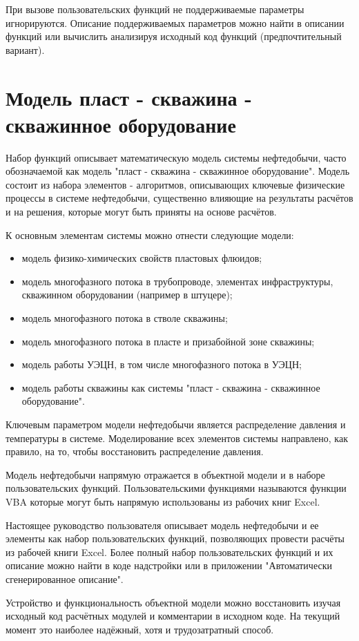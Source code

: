 При вызове пользовательских функций не поддерживаемые параметры игнорируются. Описание поддерживаемых параметров можно найти в описании функций или вычислить анализируя исходный код функций (предпочтительный вариант).

\section{Модель пласт - скважина - скважинное оборудование}

Набор функций \unf{} описывает математическую модель системы нефтедобычи, часто обозначаемой как модель "пласт - скважина - скважинное оборудование". Модель состоит из набора элементов - алгоритмов, описывающих ключевые физические процессы в системе нефтедобычи, существенно влияющие на результаты расчётов и на решения, которые могут быть приняты на основе расчётов.

К основным элементам системы можно отнести следующие модели:
\begin{itemize}
	\item модель физико-химических свойств пластовых флюидов;
	\item модель многофазного потока в трубопроводе, элементах инфраструктуры, скважинном оборудовании (например в штуцере);
	\item модель многофазного потока в стволе скважины;
	\item модель многофазного потока в пласте и призабойной зоне скважины;
	\item модель работы УЭЦН, в том числе многофазного потока в УЭЦН;
	\item модель работы скважины как системы "пласт - скважина - скважинное оборудование".
\end{itemize}

Ключевым параметром модели нефтедобычи является распределение давления и температуры в системе. Моделирование всех элементов системы направлено, как правило, на то, чтобы восстановить распределение давления.

Модель нефтедобычи напрямую отражается в объектной модели \unf{} и в наборе пользовательских функций. Пользовательскими функциями называются функции VBA которые могут быть напрямую использованы из рабочих книг Excel. 

Настоящее руководство пользователя описывает модель нефтедобычи и ее элементы как набор пользовательских функций, позволяющих провести расчёты из рабочей книги Excel. Более полный набор пользовательских функций и их описание можно найти в коде надстройки или в приложении "Автоматически сгенерированное описание".

Устройство и функциональность объектной модели \unf{} можно восстановить изучая исходный код расчётных модулей и комментарии в исходном коде. На текущий момент это наиболее надёжный, хотя и трудозатратный способ.